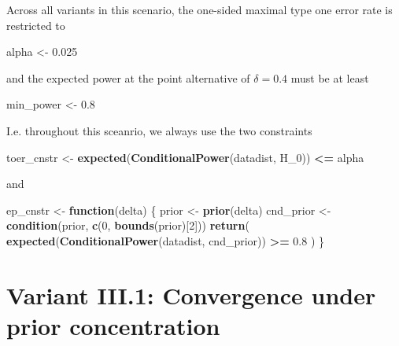 \documentclass[]{book}
\newenvironment{Shaded}{\begin{snugshade}}{\end{snugshade}}
\newcommand{\ControlFlowTok}[1]{\textcolor[rgb]{0.13,0.29,0.53}{\textbf{#1}}}
\newcommand{\DecValTok}[1]{\textcolor[rgb]{0.00,0.00,0.81}{#1}}
\newcommand{\FloatTok}[1]{\textcolor[rgb]{0.00,0.00,0.81}{#1}}
\newcommand{\KeywordTok}[1]{\textcolor[rgb]{0.13,0.29,0.53}{\textbf{#1}}}
\newcommand{\NormalTok}[1]{#1}
\newcommand{\OperatorTok}[1]{\textcolor[rgb]{0.81,0.36,0.00}{\textbf{#1}}}
\newcommand{\StringTok}[1]{\textcolor[rgb]{0.31,0.60,0.02}{#1}}
\begin{document}
Across all variants in this scenario, the one-sided maximal
type one error rate is restricted to

\begin{Shaded}
\begin{Highlighting}[]
\NormalTok{alpha <-}\StringTok{ }\FloatTok{0.025}
\end{Highlighting}
\end{Shaded}

and the expected power at the point alternative of \(\delta=0.4\) must
be at least

\begin{Shaded}
\begin{Highlighting}[]
\NormalTok{min_power <-}\StringTok{ }\FloatTok{0.8}
\end{Highlighting}
\end{Shaded}

I.e. throughout this sceanrio, we always use the two
constraints

\begin{Shaded}
\begin{Highlighting}[]
\NormalTok{toer_cnstr <-}\StringTok{ }\KeywordTok{expected}\NormalTok{(}\KeywordTok{ConditionalPower}\NormalTok{(datadist, H_}\DecValTok{0}\NormalTok{)) }\OperatorTok{<=}\StringTok{ }\NormalTok{alpha}
\end{Highlighting}
\end{Shaded}

and

\begin{Shaded}
\begin{Highlighting}[]
\NormalTok{ep_cnstr <-}\StringTok{ }\ControlFlowTok{function}\NormalTok{(delta) \{}
\NormalTok{    prior     <-}\StringTok{ }\KeywordTok{prior}\NormalTok{(delta)}
\NormalTok{    cnd_prior <-}\StringTok{ }\KeywordTok{condition}\NormalTok{(prior, }\KeywordTok{c}\NormalTok{(}\DecValTok{0}\NormalTok{, }\KeywordTok{bounds}\NormalTok{(prior)[}\DecValTok{2}\NormalTok{]))}
    \KeywordTok{return}\NormalTok{( }\KeywordTok{expected}\NormalTok{(}\KeywordTok{ConditionalPower}\NormalTok{(datadist, cnd_prior)) }\OperatorTok{>=}\StringTok{ }\FloatTok{0.8}\NormalTok{ )}
\NormalTok{\}}
\end{Highlighting}
\end{Shaded}

\hypertarget{variantIII_1}{%
\section{Variant III.1: Convergence under prior concentration}\label{variantIII_1}}
\end{document}
